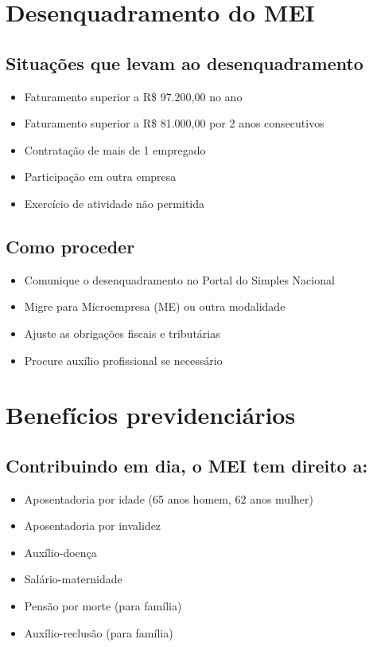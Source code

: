 \documentclass[12pt,a4paper]{article}
\begin{document}
\section{Desenquadramento do MEI}

\subsection{Situações que levam ao desenquadramento}
\begin{itemize}
    \item Faturamento superior a R\$ 97.200,00 no ano
    \item Faturamento superior a R\$ 81.000,00 por 2 anos consecutivos
    \item Contratação de mais de 1 empregado
    \item Participação em outra empresa
    \item Exercício de atividade não permitida
\end{itemize}

\subsection{Como proceder}
\begin{itemize}
    \item Comunique o desenquadramento no Portal do Simples Nacional
    \item Migre para Microempresa (ME) ou outra modalidade
    \item Ajuste as obrigações fiscais e tributárias
    \item Procure auxílio profissional se necessário
\end{itemize}

\section{Benefícios previdenciários}

\subsection{Contribuindo em dia, o MEI tem direito a:}
\begin{itemize}
    \item Aposentadoria por idade (65 anos homem, 62 anos mulher)
    \item Aposentadoria por invalidez
    \item Auxílio-doença
    \item Salário-maternidade
    \item Pensão por morte (para família)
    \item Auxílio-reclusão (para família)
\end{itemize}
\end{document}
